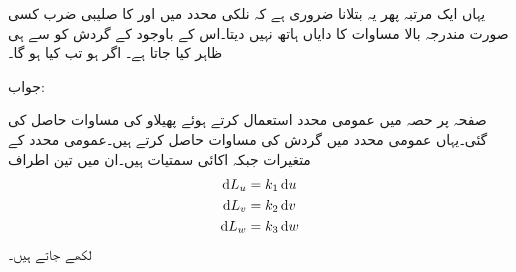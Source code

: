 یہاں ایک مرتبہ پھر یہ بتلانا ضروری ہے کہ نلکی محدد میں  اور  کا صلیبی ضرب کسی صورت مندرجہ بالا مساوات کا دایاں ہاتھ نہیں دیتا۔اس کے باوجود  کے  گردش کو  سے ہی ظاہر کیا جاتا ہے۔ 
اگر  ہو تب  کیا ہو گا۔

جواب:

صفحہ  پر حصہ  میں عمومی محدد استعمال کرتے ہوئے پھیلاو کی مساوات حاصل کی گئی۔یہاں عمومی محدد میں گردش کی مساوات حاصل کرتے ہیں۔عمومی محدد کے متغیرات  جبکہ اکائی سمتیات  ہیں۔ان میں تین اطراف
\begin{align*}
\dif L_u &= k_1 \dif u \\
\dif L_v &= k_2 \dif v \\
\dif L_w &= k_3 \dif w 
\end{align*}
لکھے جاتے ہیں۔

